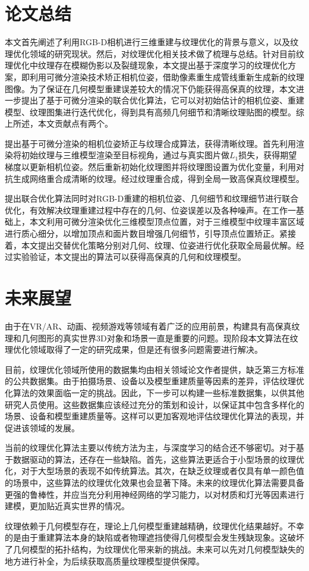 

\summary

\section*{论文总结}


本文首先阐述了利用RGB-D相机进行三维重建与纹理优化的背景与意义，以及纹理优化领域的研究现状。然后，对纹理优化相关技术做了梳理与总结。针对目前纹理优化中纹理存在模糊伪影以及裂缝现象，本文提出基于深度学习的纹理优化方案，即利用可微分渲染技术矫正相机位姿，借助像素重生成管线重新生成新的纹理图像。为了保证在几何模型重建误差较大的情况下仍能获得高保真的纹理，本文进一步提出了基于可微分渲染的联合优化算法，它可以对初始估计的相机位姿、重建模型、纹理图集进行迭代优化，得到具有高频几何细节和清晰纹理贴图的模型。综上所述，本文贡献点有两个。\par
提出基于可微分渲染的相机位姿矫正与纹理合成算法，获得清晰纹理。首先利用渲染将初始纹理与三维模型渲染至目标视角，通过与真实图片做$L_1$损失，获得期望梯度以更新相机位姿。然后重新初始化纹理图并将纹理图设置为优化变量，利用对抗生成网络重合成清晰的纹理。经过纹理重合成，得到全局一致高保真纹理模型。\par
提出联合优化算法同时对RGB-D重建的相机位姿、几何细节和纹理细节进行联合优化，有效解决纹理重建过程中存在的几何、位姿误差以及各种噪声。在工作一基础上，本文利用可微分渲染优化三维模型顶点位置，对于三维模型中纹理丰富区域进行质心细分，以增加顶点和面片数目增强几何细节，引导顶点位置矫正。紧接着，本文提出交替优化策略分别对几何、纹理、位姿进行优化获取全局最优解。经过实验验证，本文提出的算法可以获得高保真的几何和纹理模型。
\section*{未来展望}
由于在VR/AR、动画、视频游戏等领域有着广泛的应用前景，构建具有高保真纹理和几何图形的真实世界3D对象和场景一直是重要的问题。现阶段本文算法在纹理优化领域取得了一定的研究成果，但是还有很多问题需要进行解决。\par
目前，纹理优化领域所使用的数据集均由相关领域论文作者提供，缺乏第三方标准的公共数据集。由于拍摄场景、设备以及模型重建质量等因素的差异，评估纹理优化算法的效果面临一定的挑战。因此，下一步可以构建一些标准数据集，以供其他研究人员使用。这些数据集应该经过充分的策划和设计，以保证其中包含多样化的场景、设备和模型重建质量等。这样可以更加客观地评估纹理优化算法的表现，并促进该领域的发展。\par

当前的纹理优化算法主要以传统方法为主，与深度学习的结合还不够密切。对于基于数据驱动的算法，还存在一些缺陷。首先，这些算法更适合于小型场景的纹理优化，对于大型场景的表现不如传统算法。其次，在缺乏纹理或者仅具有单一颜色值的场景中，这些算法的纹理优化效果也会显著下降。未来的纹理优化算法需要具备更强的鲁棒性，并应当充分利用神经网络的学习能力，以对材质和灯光等因素进行建模，更加贴近真实世界的情况。\par
纹理依赖于几何模型存在，理论上几何模型重建越精确，纹理优化结果越好。不幸的是由于重建算法本身的缺陷或者物理遮挡使得几何模型会发生残缺现象。这破坏了几何模型的拓扑结构，为纹理优化带来新的挑战。未来可以先对几何模型缺失的地方进行补全，为后续获取高质量纹理模型提供保障。